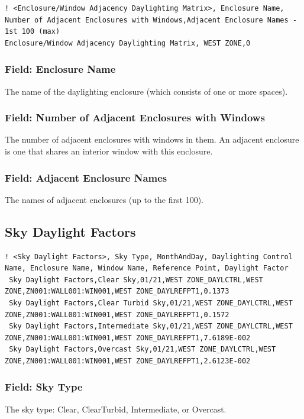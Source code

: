 \begin{lstlisting}
! <Enclosure/Window Adjacency Daylighting Matrix>, Enclosure Name, Number of Adjacent Enclosures with Windows,Adjacent Enclosure Names - 1st 100 (max)
Enclosure/Window Adjacency Daylighting Matrix, WEST ZONE,0
\end{lstlisting}

\subsubsection{Field: Enclosure Name}\label{field-daylighting-matrix-enclosurename}
The name of the daylighting enclosure (which consists of one or more spaces).

\subsubsection{Field: Number of Adjacent Enclosures with Windows}\label{field-daylighting-matrix-num-adj-enclosures}
The number of adjacent enclosures with windows in them.  An adjacent enclosure is one that shares an interior window with this enclosure.

\subsubsection{Field: Adjacent Enclosure Names}\label{field-daylighting-matrix-adj-encl-names}
The names of adjacent enclosures (up to the first 100).

\subsection{Sky Daylight Factors}\label{sky-daylight-factors}

\begin{lstlisting}
! <Sky Daylight Factors>, Sky Type, MonthAndDay, Daylighting Control Name, Enclosure Name, Window Name, Reference Point, Daylight Factor
 Sky Daylight Factors,Clear Sky,01/21,WEST ZONE_DAYLCTRL,WEST ZONE,ZN001:WALL001:WIN001,WEST ZONE_DAYLREFPT1,0.1373
 Sky Daylight Factors,Clear Turbid Sky,01/21,WEST ZONE_DAYLCTRL,WEST ZONE,ZN001:WALL001:WIN001,WEST ZONE_DAYLREFPT1,0.1572
 Sky Daylight Factors,Intermediate Sky,01/21,WEST ZONE_DAYLCTRL,WEST ZONE,ZN001:WALL001:WIN001,WEST ZONE_DAYLREFPT1,7.6189E-002
 Sky Daylight Factors,Overcast Sky,01/21,WEST ZONE_DAYLCTRL,WEST ZONE,ZN001:WALL001:WIN001,WEST ZONE_DAYLREFPT1,2.6123E-002
\end{lstlisting}

\subsubsection{Field: Sky Type}\label{field-sky-daylight-factors-sky-type}
The sky type: Clear, ClearTurbid, Intermediate, or Overcast.

